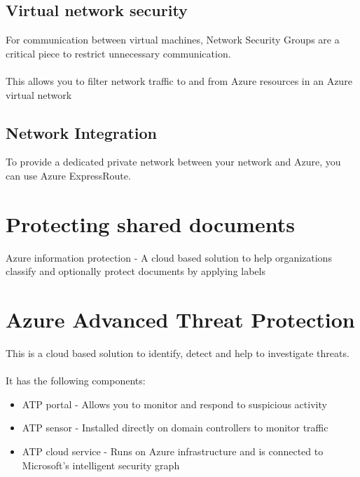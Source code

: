 \documentclass{article}[18pt]
\begin{document}
\subsection{Virtual network security}
For communication between virtual machines, Network Security Groups are a critical piece to restrict unnecessary communication.\\
\\
This allows you to filter network traffic to and from Azure resources in an Azure virtual network
\subsection{Network Integration}
To provide a dedicated private network between your network and Azure, you can use Azure ExpressRoute.
\section{Protecting shared documents}
Azure information protection - A cloud based solution to help organizations classify and optionally protect documents by applying labels
\section{Azure Advanced Threat Protection}
This is a cloud based solution to identify, detect and help to investigate threats.\\
\\
It has the following components:
\begin{itemize}
	\item ATP portal - Allows you to monitor and respond to suspicious activity
	\item ATP sensor - Installed directly on domain controllers to monitor traffic
	\item ATP cloud service - Runs on Azure infrastructure and is connected to Microsoft's intelligent security graph
\end{itemize}
\end{document}
